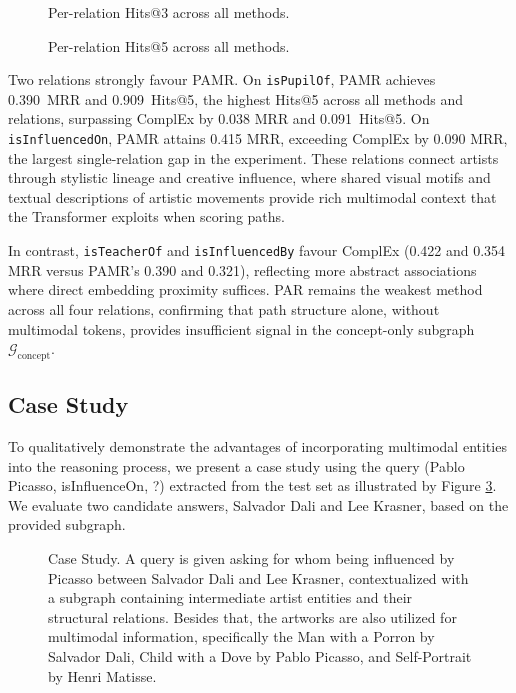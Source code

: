 \documentclass[runningheads]{llncs}
\begin{document}
\begin{figure}[t]
  \centering
  
  \caption{Per-relation Hits@3 across all methods.}
  \label{fig:hits3}
\end{figure}

\begin{figure}[t]
  \centering
  
  \caption{Per-relation Hits@5 across all methods.}
  \label{fig:hits5}
\end{figure}

Two relations strongly favour PAMR. On \texttt{isPupilOf}, PAMR
achieves 0.390~MRR and 0.909~Hits@5, the highest Hits@5 across all
methods and relations, surpassing ComplEx by 0.038 MRR and
0.091~Hits@5. On \texttt{isInfluencedOn}, PAMR attains 0.415 MRR,
exceeding ComplEx by 0.090 MRR, the largest single-relation gap in
the experiment. These relations connect artists through stylistic
lineage and creative influence, where shared visual motifs and textual
descriptions of artistic movements provide rich multimodal context
that the Transformer exploits when scoring paths.

In contrast, \texttt{isTeacherOf} and \texttt{isInfluencedBy} favour
ComplEx (0.422 and 0.354 MRR versus PAMR's 0.390 and 0.321),
reflecting more abstract associations where direct embedding proximity
suffices. PAR remains the weakest method across all four relations,
confirming that path structure alone, without multimodal tokens,
provides insufficient signal in the concept-only subgraph
$\mathcal{G}_{\text{concept}}$.

\subsection{Case Study}
\label{sec:case-study}

To qualitatively demonstrate the advantages of incorporating multimodal entities into the reasoning process, we present a case study using the query (Pablo Picasso, isInfluenceOn, ?) extracted from the test set as illustrated by Figure \ref{fig:case-study}. We evaluate two candidate answers, Salvador Dali and Lee Krasner, based on the provided subgraph.

\begin{figure}[t]
  \centering
  
  \caption{Case Study. A query is given asking for whom being influenced by Picasso between Salvador Dali and Lee Krasner, contextualized with a subgraph containing intermediate artist entities and their structural relations. Besides that, the artworks are also utilized for multimodal information, specifically the Man with a Porron by Salvador Dali, Child with a Dove by Pablo Picasso, and Self-Portrait by Henri Matisse.}
  \label{fig:case-study}
\end{figure}
\end{document}
